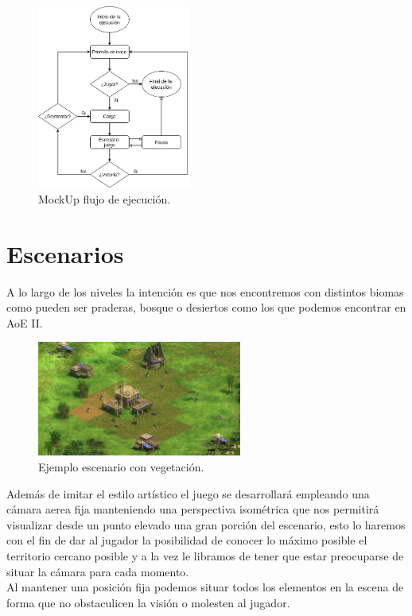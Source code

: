 \begin{figure}[ht]
\centering
\includegraphics[width=0.45\textwidth]{imagenes/gdd/pantallas/flow_ejecucion.png}
\caption{MockUp flujo de ejecución.}
\label{esq:flow_juego}
\end{figure}

\section{Escenarios}
A lo largo de los niveles la intención es que nos encontremos con distintos biomas como
pueden ser praderas, bosque o desiertos como los que podemos encontrar en \ac{AoE} II.

\begin{figure}[ht]
\centering
\includegraphics[width=0.6\textwidth]{imagenes/gdd/mapa_aoe_1.jpg}
\caption{Ejemplo escenario con vegetación.}
\label{img:mapa_aoe1}
\end{figure}


Además de imitar el estilo artístico el juego se desarrollará empleando una cámara
aerea fija manteniendo una perspectiva isométrica que nos permitirá visualizar desde
un punto elevado una gran porción del escenario, esto lo haremos con el fin de dar al
jugador la posibilidad de conocer lo máximo posible el territorio cercano posible y a la
vez le libramos de tener que estar preocuparse de situar la cámara para cada momento. \\
Al mantener una posición fija podemos situar todos los elementos en la escena de forma
que no obstaculicen la visión o molesten al jugador.

